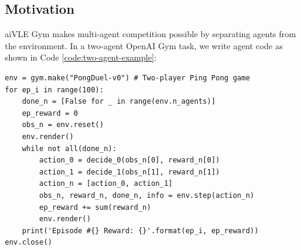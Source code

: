\documentclass[fyp]{socreport}
\newenvironment{code}{\captionsetup{type=listing}}{}
\begin{document}
\subsection{Motivation}
aiVLE Gym makes multi-agent competition possible by separating agents from the environment. In a two-agent OpenAI Gym task, we write agent code as shown in Code \ref{code:two-agent-example}:

\begin{code}
\begin{verbatim}
env = gym.make("PongDuel-v0") # Two-player Ping Pong game
for ep_i in range(100):
    done_n = [False for _ in range(env.n_agents)]
    ep_reward = 0
    obs_n = env.reset()
    env.render()
    while not all(done_n):
        action_0 = decide_0(obs_n[0], reward_n[0])
        action_1 = decide_1(obs_n[1], reward_n[1])
        action_n = [action_0, action_1]
        obs_n, reward_n, done_n, info = env.step(action_n)
        ep_reward += sum(reward_n)
        env.render()
    print('Episode #{} Reward: {}'.format(ep_i, ep_reward))
env.close()
\end{verbatim}
\label{code:two-agent-example}
\end{code}
\end{document}
